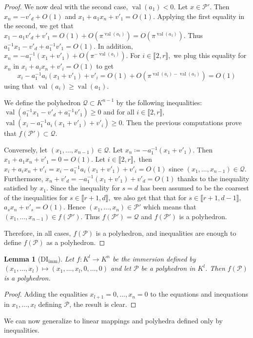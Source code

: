 \documentclass[sigconf]{acmart}
\newcommand{\PP}{\mathcal{P}}
\newcommand{\Qc}{\mathcal{Q}}
\newtheorem{lemma}[theorem]{Lemma}
\DeclareMathOperator{\val}{val}
\begin{document}
\begin{proof}
We now deal with the second case, $\val(a_1)<0.$
Let $x \in \PP'$.
Then $x_n=-v'_d+O(1)$
and $x_1+a_1 x_n+v'_1=O(1).$
Applying the first equality in the second, we get that
$x_1-a_1 v'_d +v'_1=O(1)+O(\pi^{\val(a_1)})=O(\pi^{\val(a_1)}).$
Thus $a_1^{-1}x_1- v'_d +a_1^{-1}v'_1=O(1)$.
In addition, $x_n=-a_1^{-1}(x_1+v'_1)+O(\pi^{-\val(a_1)}).$
For $i \in \llbracket 2,r \rrbracket,$ we plug this equality for $x_n$ in 
$x_i+a_i x_n+v'_i=O(1)$ to get
$$
x_i-a_1^{-1}a_i(x_1+v'_1)+v'_i=O(1)+O(\pi^{\val(a_i)-\val(a_1)})=O(1)
$$
using that $\val(a_i) \geq \val (a_1).$

We define the polyhedron $\Qc \subset K^{n-1}$ by the following inequalities:
$\val(a_1^{-1}x_1- v'_d +a_1^{-1}v'_1) \geq 0$ and for all $i \in \llbracket 2,r \rrbracket,$
$\val(x_i-a_1^{-1}a_i(x_1+v'_1)+v'_i) \geq 0.$
Then the previous computations prove that $f(\PP')\subset \Qc.$

Conversely, let $(x_1,\dots,x_{n-1}) \in \Qc.$
Let $x_n \coloneq -a_1^{-1}(x_1+v'_1).$
Then
$x_1+a_1 x_n+v'_1=0=O(1).$
Let $i \in \llbracket 2,r \rrbracket,$
then $x_i+a_i x_n+v'_i=x_i-a_1^{-1}a_i(x_1+v'_1)+v'_i=O(1)$
since $(x_1,\dots,x_{n-1}) \in \Qc.$
Furthermore, 
$x_n+v'_d=-a_1^{-1}(x_1+v'_1)+v'_d=O(1)$ thanks to the inequality satisfied by $x_1.$
Since the inequality for $s=d$ has been assumed to be 
the coarsest of the inequalities for $s \in \llbracket r+1,d \rrbracket,$
we also get that that for $s \in \llbracket r+1,d-1 \rrbracket,$
$a_s x_n+v'_s = O(1)$.
Hence $(x_1,\dots,x_n) \in \PP'$
which means that $(x_1,\dots,x_{n-1}) \in f(\PP').$
Thus $f(\PP')= \Qc$ and $f(\PP')$ is a polyhedron.

Therefore, in all cases, $f(\PP)$ is a polyhedron, and inequalities are enough to define
$f(\PP)$ as a polyhedron.
\end{proof}

\begin{lemma}[DI${}_{\mathrm{imm}}$]
  Let $f : K^l \to K^n$ be the immersion defined by
  $(x_1,\dots, x_l) \mapsto (x_1,\dots, x_l,0,\dots, 0)$ and let $\PP$ be
  a polyhedron in $K^l$. Then $f(\PP)$ is a polyhedron. \label{lem:DIimm}
\end{lemma}
\begin{proof}
Adding the equalities $x_{l+1}=0, \dots, x_n=0$ to the equations and inequations in
$x_1,\dots, x_l$ defining $\PP$, the result is clear.
\end{proof}

We can now generalize to linear mappings and polyhedra defined only by inequalities.
\end{document}
